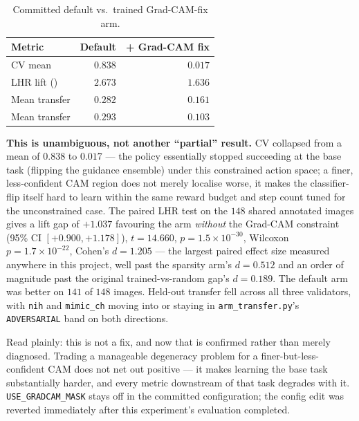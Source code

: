 \begin{table}[h]
\centering
\caption{Committed default vs.\ trained Grad-CAM-fix arm.}
\label{tab:gradcam_fix_results}
\begin{tabular}{@{}lrr@{}}
\toprule
\textbf{Metric} & \textbf{Default} & \textbf{+ Grad-CAM fix} \\
\midrule
CV mean & $0.838$ & $\mathbf{0.017}$ \\
LHR lift (\pton{}) & $2.673$ & $1.636$ \\
Mean transfer \ntop{} & $0.282$ & $0.161$ \\
Mean transfer \pton{} & $0.293$ & $0.103$ \\
\bottomrule
\end{tabular}
\end{table}

\textbf{This is unambiguous, not another ``partial'' result.} CV
collapsed from a mean of $0.838$ to $0.017$ --- the policy essentially
stopped succeeding at the base task (flipping the guidance ensemble)
under this constrained action space; a finer, less-confident CAM region
does not merely localise worse, it makes the classifier-flip itself hard
to learn within the same reward budget and step count tuned for the
unconstrained case. The paired LHR test on the $148$ shared annotated
images gives a lift gap of $+1.037$ favouring the arm \emph{without} the
Grad-CAM constraint (95\% CI $[+0.900, +1.178]$), $t=14.660$,
$p=1.5\times10^{-30}$, Wilcoxon $p=1.7\times10^{-22}$, Cohen's
$d=1.205$ --- the largest paired effect size measured anywhere in this
project, well past the sparsity arm's $d=0.512$ and an order of magnitude
past the original trained-vs-random gap's $d=0.189$. The default arm was
better on $141$ of $148$ images. Held-out transfer fell across all three
validators, with \texttt{nih} and \texttt{mimic\_ch} moving into or
staying in \texttt{arm\_transfer.py}'s \texttt{ADVERSARIAL} band on both
directions.

Read plainly: this is not a fix, and now that is confirmed rather than
merely diagnosed. Trading a manageable degeneracy problem for a
finer-but-less-confident CAM does not net out positive --- it makes
learning the base task substantially harder, and every metric downstream
of that task degrades with it. \texttt{USE\_GRADCAM\_MASK} stays off in
the committed configuration; the config edit was reverted immediately
after this experiment's evaluation completed.

